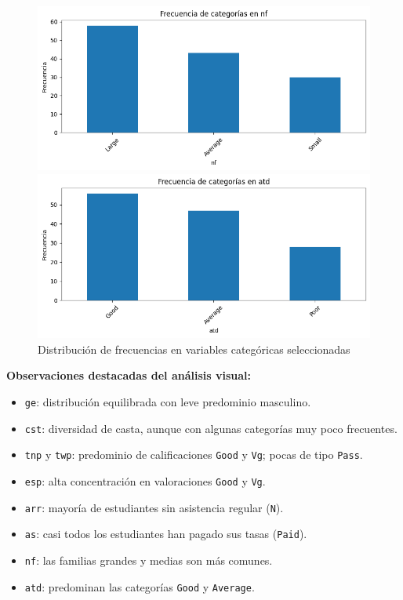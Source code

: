 \documentclass[11pt,a4paper]{article}
\begin{document}
\begin{figure}[H]
  \medskip

  \begin{minipage}{0.32\textwidth}
    \includegraphics[width=\linewidth]{img/frecuencia_nf.png}
  \end{minipage}
  \hfill
  \begin{minipage}{0.32\textwidth}
    \includegraphics[width=\linewidth]{img/frecuencia_atd.png}
  \end{minipage}

  \caption*{Distribución de frecuencias en variables categóricas seleccionadas}
\end{figure}

\textbf{Observaciones destacadas del análisis visual:}

\begin{itemize}
    \item \texttt{ge}: distribución equilibrada con leve predominio masculino.
    \item \texttt{cst}: diversidad de casta, aunque con algunas categorías muy poco frecuentes.
    \item \texttt{tnp} y \texttt{twp}: predominio de calificaciones \texttt{Good} y \texttt{Vg}; pocas de tipo \texttt{Pass}.
    \item \texttt{esp}: alta concentración en valoraciones \texttt{Good} y \texttt{Vg}.
    \item \texttt{arr}: mayoría de estudiantes sin asistencia regular (\texttt{N}).
    \item \texttt{as}: casi todos los estudiantes han pagado sus tasas (\texttt{Paid}).
    \item \texttt{nf}: las familias grandes y medias son más comunes.
    \item \texttt{atd}: predominan las categorías \texttt{Good} y \texttt{Average}.
\end{itemize}
\end{document}
